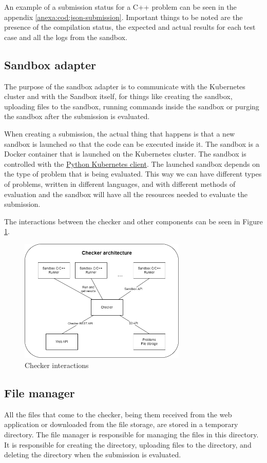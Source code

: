\documentclass[12pt,a4paper]{report}
\begin{document}
An example of a submission status for a C++ problem can be seen in the appendix \ref{anexa:cod:json-submission}. Important things to be noted are the presence of the compilation status, the expected and actual results for each test case and all the logs from the sandbox.

\subsection{Sandbox adapter}
The purpose of the sandbox adapter is to communicate with the Kubernetes cluster and with the Sandbox itself, for things like creating the sandbox, uploading files to the sandbox, running commands inside the sandbox or purging the sandbox after the submission is evaluated.

When creating a submission, the actual thing that happens is that a new sandbox is launched so that the code can be executed inside it. The sandbox is a Docker container that is launched on the Kubernetes cluster. The sandbox is controlled with the \href{https://github.com/kubernetes-client/python}{Python Kubernetes client}. The launched sandbox depends on the type of problem that is being evaluated. This way we can have different types of problems, written in different languages, and with different methods of evaluation and the sandbox will have all the resources needed to evaluate the submission.

The interactions between the checker and other components can be seen in Figure \ref{fig:checker-interactions}.
\begin{figure}[h]
	\centering
	\includegraphics[width=300px]{../photos/checker-architecture.png}
	\caption{Checker interactions}
	\label{fig:checker-interactions}
\end{figure} 


\subsection{File manager}
All the files that come to the checker, being them received from the web application or downloaded from the file storage, are stored in a temporary directory. The file manager is responsible for managing the files in this directory. It is responsible for creating the directory, uploading files to the directory, and deleting the directory when the submission is evaluated.
\end{document}
